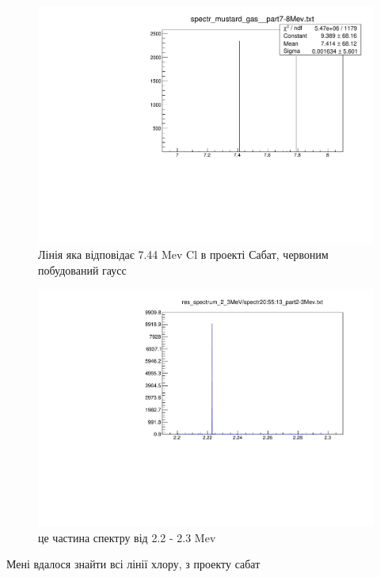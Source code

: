 \documentclass[a4paper, 14pt]{article}
\numberwithin{equation}{section}
\numberwithin{table}{section}
\numberwithin{equation}{section}
\numberwithin{table}{section}
\begin{document}
		\begin{figure}[hbt!]
			\centering \includegraphics[width=1\textwidth]{Cl7_44MeV.pdf}
			\caption{Лінія яка відповідає 7.44 Mev Cl в проекті Сабат, червоним побудований гаусс}
			\label{ris:image7}
		\end{figure}

		\begin{figure}[hbt!]
			\centering \includegraphics[width=1\textwidth]{2_3MeV.pdf}
			\caption{це частина спектру від 2.2 - 2.3 Mev}
			\label{ris:image7}
		\end{figure}
	
	Мені вдалося знайти всі лінії хлору, з проекту сабат 
	
	
\end{document}
